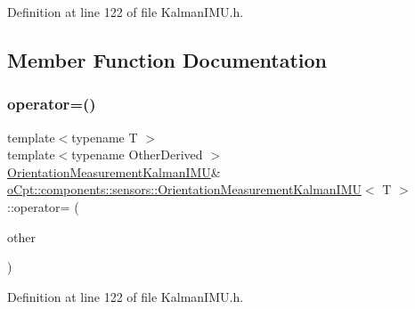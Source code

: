 Definition at line 122 of file Kalman\+I\+M\+U.\+h.



\subsection{Member Function Documentation}
\hypertarget{classo_cpt_1_1components_1_1sensors_1_1_orientation_measurement_kalman_i_m_u_a266796bd7b5994657cd351b92aa9c251}{}\label{classo_cpt_1_1components_1_1sensors_1_1_orientation_measurement_kalman_i_m_u_a266796bd7b5994657cd351b92aa9c251} 
\subsubsection{\texorpdfstring{operator=()}{operator=()}}
{\footnotesize\ttfamily template$<$typename T $>$ \\
template$<$typename Other\+Derived $>$ \\
\hyperlink{classo_cpt_1_1components_1_1sensors_1_1_orientation_measurement_kalman_i_m_u}{Orientation\+Measurement\+Kalman\+I\+MU}\& \hyperlink{classo_cpt_1_1components_1_1sensors_1_1_orientation_measurement_kalman_i_m_u}{o\+Cpt\+::components\+::sensors\+::\+Orientation\+Measurement\+Kalman\+I\+MU}$<$ T $>$\+::operator= (\begin{DoxyParamCaption}\item[{const Eigen\+::\+Matrix\+Base$<$ Other\+Derived $>$ \&}]{other }\end{DoxyParamCaption})\hspace{0.3cm}{\ttfamily [inline]}}



Definition at line 122 of file Kalman\+I\+M\+U.\+h.

\hypertarget{classo_cpt_1_1components_1_1sensors_1_1_orientation_measurement_kalman_i_m_u_a0cad53095982781c6631c31ba2282bd7}{}\label{classo_cpt_1_1components_1_1sensors_1_1_orientation_measurement_kalman_i_m_u_a0cad53095982781c6631c31ba2282bd7} 
